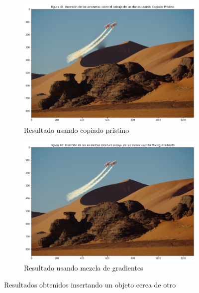 \documentclass[11pt,twoside,titlepage,a4paper]{article}
\numberwithin{equation}{section} %
\theoremstyle{usual}
\begin{document}
\begin{figure}[h]
    \centering
    \begin{subfigure}[b]{.45\textwidth}
        \centering
        \includegraphics[width=\textwidth]{imagenes/PoissonImageEditing_cell_58_output_0.png}
        \caption{Resultado usando copiado prístino}
        \label{fig:resultadoInsercionCercaCopiadoPristino}
    \end{subfigure}%
    \begin{subfigure}[b]{.45\textwidth}
        \centering
        \includegraphics[width=\textwidth]{imagenes/PoissonImageEditing_cell_58_output_1.png}
        \caption{Resultado usando mezcla de gradientes}
        \label{fig:resultadoInsercionCercaMixingGradients}
    \end{subfigure}
    \caption{Resultados obtenidos insertando un objeto cerca de otro}
    \label{fig:resultadosInsercionCerca}
\end{figure}
\end{document}
